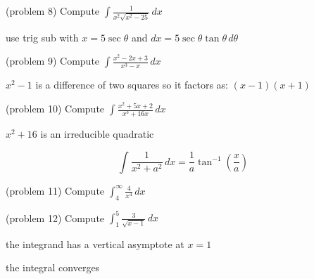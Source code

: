 \documentclass[handout]{ximera}
\begin{document}
\begin{problem}(problem 8)
Compute $\displaystyle \int \frac{1}{x^2 \sqrt{x^2 - 25}} \, dx$

\begin{hint}
use trig sub with $x = 5\sec \theta$ and $dx = 5 \sec \theta \tan \theta \, d\theta$
\end{hint}

\end{problem}

\begin{problem}(problem 9)
Compute $\displaystyle \int \frac{x^2 - 2x+3}{x^3-x} \, dx$

\begin{hint}
$x^2 - 1$ is a difference of two squares so it factors as: $(x-1)(x+1)$
\end{hint}

\end{problem}

\begin{problem}(problem 10)
Compute $\displaystyle \int \frac{x^2 + 5x + 2}{x^3 + 16x} \, dx$

\begin{hint}
$x^2 + 16$ is an irreducible quadratic
\end{hint}

\begin{hint}
\[
\int \frac{1}{x^2 + a^2} \, dx = \frac{1}{a} \tan^{-1}\left(\frac{x}{a}\right)
\]
\end{hint}


\end{problem}

\begin{problem}(problem 11)
Compute $\displaystyle \int_4^\infty \frac{4}{x^4} \, dx$

\end{problem}

\begin{problem}(problem 12)
Compute $\displaystyle \int_1^5 \frac{3}{\sqrt{x-1}} \, dx$

\begin{hint}
the integrand has a vertical asymptote at $x = 1$
\end{hint}

\begin{hint}
the integral converges
\end{hint}

\end{problem}
\end{document}
